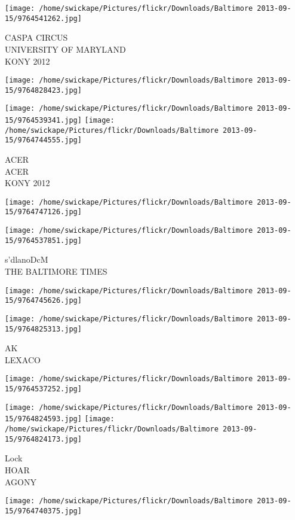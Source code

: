 \documentclass[10pt,letterpaper]{article}
\begin{document}
\texttt{[image: /home/swickape/Pictures/flickr/Downloads/Baltimore 2013-09-15/9764541262.jpg]}

CASPA CIRCUS\\
UNIVERSITY OF MARYLAND\\
KONY 2012
\pagebreak

\texttt{[image: /home/swickape/Pictures/flickr/Downloads/Baltimore 2013-09-15/9764828423.jpg]}

\vspace{0.25in}
\texttt{[image: /home/swickape/Pictures/flickr/Downloads/Baltimore 2013-09-15/9764539341.jpg]}
\texttt{[image: /home/swickape/Pictures/flickr/Downloads/Baltimore 2013-09-15/9764744555.jpg]}

ACER\\
ACER\\
KONY 2012
\pagebreak

\texttt{[image: /home/swickape/Pictures/flickr/Downloads/Baltimore 2013-09-15/9764747126.jpg]}

\vspace{0.25in}
\texttt{[image: /home/swickape/Pictures/flickr/Downloads/Baltimore 2013-09-15/9764537851.jpg]}

s'dlanoDcM\\
THE BALTIMORE TIMES
\pagebreak

\texttt{[image: /home/swickape/Pictures/flickr/Downloads/Baltimore 2013-09-15/9764745626.jpg]}

\vspace{0.25in}
\texttt{[image: /home/swickape/Pictures/flickr/Downloads/Baltimore 2013-09-15/9764825313.jpg]}

AK\\
LEXACO
\pagebreak

\texttt{[image: /home/swickape/Pictures/flickr/Downloads/Baltimore 2013-09-15/9764537252.jpg]}

\vspace{0.25in}
\texttt{[image: /home/swickape/Pictures/flickr/Downloads/Baltimore 2013-09-15/9764824593.jpg]}
\texttt{[image: /home/swickape/Pictures/flickr/Downloads/Baltimore 2013-09-15/9764824173.jpg]}

Lock\\
HOAR\\
AGONY
\pagebreak

\texttt{[image: /home/swickape/Pictures/flickr/Downloads/Baltimore 2013-09-15/9764740375.jpg]}
\end{document}

